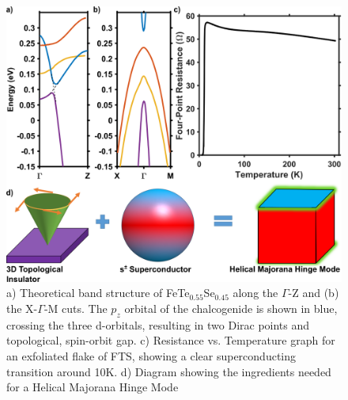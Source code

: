 \begin{figure}
    \centering
    \includegraphics[width=\textwidth]{Chap3/Figures/F1V1.png}
    \caption{a) Theoretical band structure of FeTe$_{0.55}$Se$_{0.45}$ along the $\Gamma$-Z and (b) the X-$\Gamma$-M cuts\cite{Wang2015}. The $p_{z}$ orbital of the chalcogenide is shown in blue, crossing the three d-orbitals, resulting in two Dirac points and topological, spin-orbit gap. c) Resistance vs. Temperature graph for an exfoliated flake of FTS, showing a clear superconducting transition around 10K. d) Diagram showing the ingredients needed for a Helical Majorana Hinge Mode}
    \label{HingeTheory}
\end{figure}



